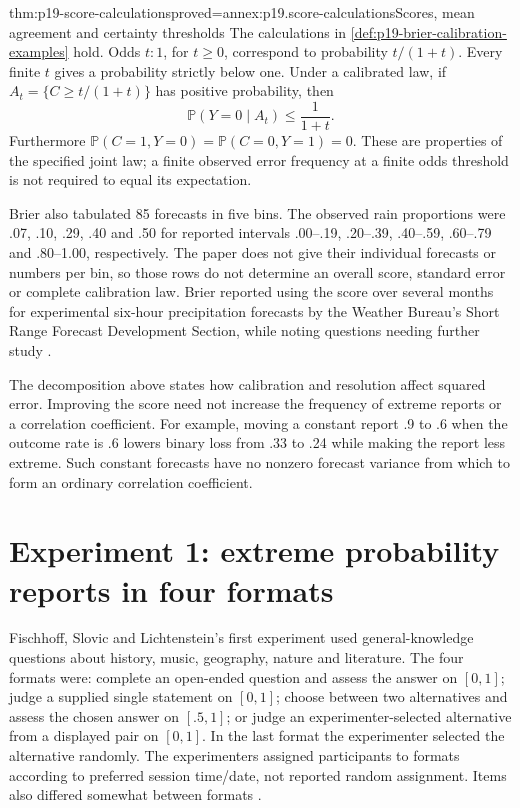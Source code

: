 \begin{hblemma}{thm:p19-score-calculations}{proved=annex:p19.score-calculations}{Scores, mean agreement and certainty thresholds}
The calculations in \cref{def:p19-brier-calibration-examples} hold. Odds
\(t:1\), for \(t\geq0\), correspond to probability \(t/(1+t)\).
Every finite \(t\) gives a probability strictly below one. Under a calibrated
law, if \(A_t=\{C\geq t/(1+t)\}\) has positive probability, then
\[
 \mathbb P(Y=0\mid A_t)\leq\frac1{1+t}.
\]
Furthermore \(\mathbb P(C=1,Y=0)=\mathbb P(C=0,Y=1)=0\).
These are properties of the specified joint law; a finite observed error
frequency at a finite odds threshold is not required to equal its expectation.
\end{hblemma}

Brier also tabulated 85 forecasts in five bins. The observed rain proportions
were .07, .10, .29, .40 and .50 for reported intervals .00--.19,
.20--.39, .40--.59, .60--.79 and .80--1.00, respectively. The paper
does not give their individual forecasts or numbers per bin, so those rows
do not determine an overall score, standard error or complete calibration
law. Brier reported using the score over several months for experimental
six-hour precipitation forecasts by the Weather Bureau's Short Range
Forecast Development Section, while noting questions needing further study
\cite[pp.~2--3, table~2]{Brier1950Verification}.

The decomposition above states how calibration and resolution affect squared
error. Improving the score need not increase the frequency of extreme reports
or a correlation coefficient. For example, moving a constant report .9 to
.6 when the outcome rate is .6 lowers binary loss from .33 to .24 while
making the report less extreme. Such constant forecasts have no nonzero
forecast variance from which to form an ordinary correlation coefficient.

\section{Experiment 1: extreme probability reports in four formats}
\label{sec:p19-certainty-experiment-one}

Fischhoff, Slovic and Lichtenstein's first experiment used general-knowledge
questions about history, music, geography, nature and literature. The four
formats were: complete an open-ended question and assess the answer on
\([0,1]\); judge a supplied single statement on \([0,1]\); choose between
two alternatives and assess the chosen answer on \([.5,1]\); or judge
an experimenter-selected alternative from a displayed pair on \([0,1]\).
In the last format the experimenter selected the alternative randomly.
The experimenters assigned participants to formats according to preferred
session time/date, not reported random assignment. Items also differed
somewhat between formats \cite[pp.~553--554]{FischhoffSlovicLichtenstein1977Certainty}.

